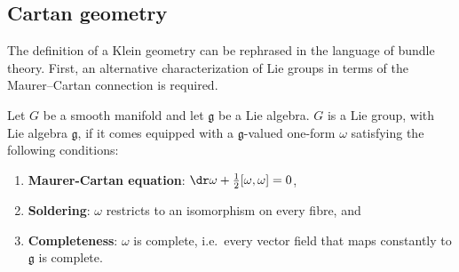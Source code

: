 
\subsection{Cartan geometry}

    The definition of a Klein geometry can be rephrased in the language of bundle theory. First, an alternative characterization of Lie groups in terms of the Maurer--Cartan connection is required.
    \begin{adefinition}
        Let $G$ be a smooth manifold and let $\mathfrak{g}$ be a Lie algebra. $G$ is a Lie group, with Lie algebra $\mathfrak{g}$, if it comes equipped with a $\mathfrak{g}$-valued one-form $\omega$ satisfying the following conditions:
        \begin{enumerate}
            \item\textbf{Maurer-Cartan equation}: $\dr\omega + \frac{1}{2}[\omega,\omega]=0$,
            \item\textbf{Soldering}: $\omega$ restricts to an isomorphism on every fibre, and
            \item\textbf{Completeness}: $\omega$ is complete, i.e.~every vector field that maps constantly to $\mathfrak{g}$ is complete.
        \end{enumerate}

    \end{adefinition}


